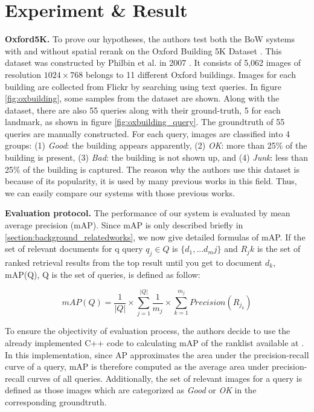 \section{Experiment \& Result} \label{section:experiment_result}

\textbf{Oxford5K.} To prove our hypotheses, the authors test both the BoW systems with and without spatial rerank on the Oxford Building 5K Dataset \cite{oxbuilding}. This dataset was constructed by Philbin et al. in 2007 \cite{2}. It consists of 5,062 images of resolution $1024 \times 768$ belongs to 11 different Oxford buildings. Images for each building are collected from Flickr by searching using text queries. In figure \ref{fig:oxbuilding}, some samples from the dataset are shown. Along with the dataset, there are also 55 queries along with their ground-truth, 5 for each landmark, as shown in figure \ref{fig:oxbuilding_query}. The groundtruth of 55 queries are manually constructed. For each query, images are classified into 4 groups: (1) \textit{Good}: the building appears apparently, (2) \textit{OK}: more than 25\% of the building is present, (3) \textit{Bad}: the building is not shown up, and (4) \textit{Junk}: less than 25\% of the building is captured. The reason why the authors use this dataset is because of its popularity, it is used by many previous works in this field. Thus, we can easily compare our systems with those previous works.

\textbf{Evaluation protocol.} The performance of our system is evaluated by mean average precision (mAP). Since mAP is only described briefly in \ref{section:background_relatedworks}, we now give detailed formulas of mAP. If the set of relevant documents for q query $q_{j} \in Q$ is $\{d_{1}, ... d_{m}{j}\}$ and $R_{j}{k}$ is the set of ranked retrieval results from the top result until you get to document $d_{k}$, mAP(Q), Q is the set of queries, is defined as follow:

\begin{equation}
mAP(Q) = \frac{1}{|Q|}\times\sum_{j=1}^{|Q|} \frac{1}{m_{j}}\times\sum_{k=1}^{m_{j}}Precision(R_{j_{k}})
\end{equation}

To ensure the objectivity of evaluation process, the authors decide to use the already implemented C++ code to calculating mAP of the ranklist available at \cite{oxbuilding}. In this implementation, since AP approximates the area under the precision-recall curve of a query, mAP is therefore computed as the average area under precision-recall curves of all queries. Additionally, the set of relevant images for a query is defined as those images which are categorized as \textit{Good} or \textit{OK} in the corresponding groundtruth.

